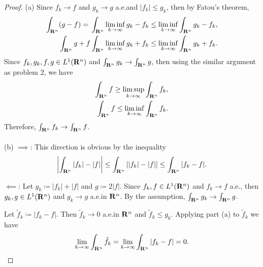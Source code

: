 \begin{proof}
(a) Since $f_k\to f$ and $g_k\to g$ a.e.\@ and $|f_k|\leq g_k$, then by
Fatou's theorem,
\begin{align*}
\int_{\mathbf{R}^n}(g-f)
={}&\int_{\mathbf{R}^n}\liminf_{k\to\infty} g_k-f_k
\leq\liminf_{k\to\infty}\int_{\mathbf{R}^n}g_k-f_k,\\
\int_{\mathbf{R}^n}g+f&\int_{\mathbf{R}^n}\liminf_{k\to\infty}g_k+f_k\leq\liminf_{k\to\infty}\int_{\mathbf{R}^n}g_k+f_k.
\end{align*}
Since $f_k,g_k,f,g\in L^1(\mathbf{R}^n)$ and $\int_{\mathbf{R}^n}g_k\to\int_{\mathbf{R}^n}g$,
then using the similar argument as problem 2, we have
\[
  \begin{aligned}
   \int_{\mathbf{R}^n}f\geq\limsup_{k\to\infty}\int_{\mathbf{R}^n}f_k,\\
   \int_{\mathbf{R}^n}f\leq\liminf_{k\to\infty}\int_{\mathbf{R}^n} f_k.
  \end{aligned}
\]
Therefore, $\int_{\mathbf{R}^n}f_k\to\int_{\mathbf{R}^n} f$.
\\\\
(b) $\implies$: This direction is obvious by the inequality
\[
\left|\int_{\mathbf{R}^n}|f_k|-|f|\right|\leq\int_{\mathbf{R}^n}\left||f_k|-|f|\right|\leq\int_{\mathbf{R}^n}|f_k-f|.
\]

$\impliedby$: Let $g_k\coloneqq |f_k|+|f|$ and $g\coloneqq 2|f|$. Since
$f_k,f\in L^1(\mathbf{R}^n)$ and $f_k\to f$ a.e., then $g_k,g\in L^1(\mathbf{R}^n)$ and
$g_k\to g$ a.e.\@ in $\mathbf{R}^n$. By the assumption, $\int_{\mathbf{R}^n}
g_k\to\int_{\mathbf{R}^n}g$.

Let $\tilde f_k\coloneqq|f_k-f|$. Then $\tilde f_k\to 0$ a.e.\@ in $\mathbf{R}^n$
and $\tilde f_k\leq g_k$. Applying part (a) to $\tilde f_k$ we have
\[
\lim_{k\to\infty}\int_{\mathbf{R}^n}\tilde f_k=\lim_{k\to\infty}\int_{\mathbf{R}^n}|f_k-f|=0.
\]
\end{proof}
